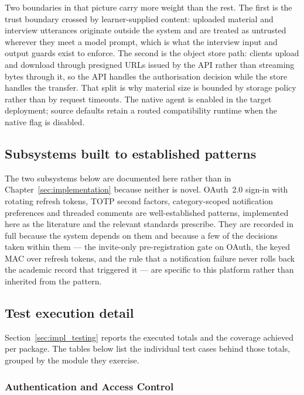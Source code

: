 Two boundaries in that picture carry more weight than the rest. The first is the trust boundary crossed by learner-supplied content: uploaded material and interview utterances originate outside the system and are treated as untrusted wherever they meet a model prompt, which is what the interview input and output guards exist to enforce. The second is the object store path: clients upload and download through presigned URLs issued by the API rather than streaming bytes through it, so the API handles the authorisation decision while the store handles the transfer. That split is why material size is bounded by storage policy rather than by request timeouts. The native agent is enabled in the target deployment; source defaults retain a routed compatibility runtime when the native flag is disabled.

\subsection*{Subsystems built to established patterns}

The two subsystems below are documented here rather than in
Chapter~\ref{sec:implementation} because neither is novel. OAuth~2.0 sign-in
with rotating refresh tokens, TOTP second factors, category-scoped
notification preferences and threaded comments are well-established patterns,
implemented here as the literature and the relevant standards prescribe. They
are recorded in full because the system depends on them and because a few of
the decisions taken within them --- the invite-only pre-registration gate on
OAuth, the keyed MAC over refresh tokens, and the rule that a notification
failure never rolls back the academic record that triggered it --- are specific
to this platform rather than inherited from the pattern.





\subsection{Test execution detail}

Section~\ref{sec:impl_testing} reports the executed totals and the coverage achieved per package. The tables below list the individual test cases behind those totals, grouped by the module they exercise.
\subsubsection{Authentication and Access Control}
\label{sec:impl_test_auth}

